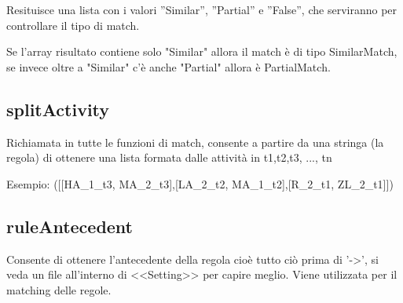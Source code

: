 \documentclass{article}
\begin{document}
Resituisce una lista con i valori ''Similar'', ''Partial'' e ''False'', che serviranno per controllare il tipo di match.

Se l'array risultato contiene solo "Similar" allora il match è di tipo SimilarMatch, se invece oltre a "Similar" c'è anche "Partial" allora è PartialMatch.

\subsection{splitActivity}
Richiamata in tutte le funzioni di match, consente a partire da una stringa (la regola) di ottenere una lista formata dalle attività in t1,t2,t3, ..., tn 

Esempio: ([[HA\_1\_t3, MA\_2\_t3],[LA\_2\_t2, MA\_1\_t2],[R\_2\_t1, ZL\_2\_t1]])

\subsection{ruleAntecedent}
Consente di ottenere l'antecedente della regola cioè tutto ciò prima di '->', si veda un file all'interno di <<Setting>> per capire meglio.
Viene utilizzata per il matching delle regole.
\end{document}
